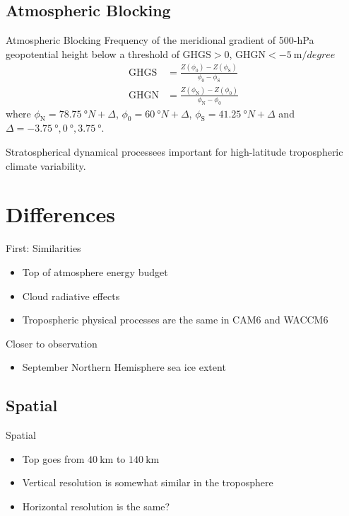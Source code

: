 \documentclass[xcolor=dvipsnames]{beamer} %
\begin{document}
\subsection{Atmospheric Blocking}
\begin{frame}{Atmospheric Blocking}
	\scriptsize
	Frequency of the meridional gradient of 500-hPa geopotential height below a
	threshold of $ \mathrm{GHGS}>0$, $\mathrm{GHGN}<\SI{-5}{\metre/degree} $
	\begin{align*}
		\mathrm{GHGS} & =\frac{Z(\phi_0)-Z(\phi_{\mathrm{S}})}{\phi_0-\phi_{\mathrm{S}}} \\
		\mathrm{GHGN} & =\frac{Z(\phi_{\mathrm{N}})-Z(\phi_0)}{\phi_\mathrm{N}-\phi_0}
		\label{eq:blocking-frequency}
	\end{align*}
	where \(\phi_{\mathrm{N}}=\SI{78.75}{\degree N}+\Delta\),
	\(\phi_{0}=\SI{60}{\degree N}+\Delta\), \(\phi_{\mathrm{S}}=\SI{41.25}{\degree N}+\Delta\)
	and \(\Delta=\SI{-3.75}{\degree},\SI{0}{\degree},\SI{3.75}{\degree}\).\cite{dandrea1998}

    Stratospherical dynamical processees important for high-latitude tropospheric
    climate variability.
\end{frame}

\section{Differences}

\begin{frame}{First: Similarities}
	\begin{itemize}
		\item Top of atmosphere energy budget
		\item Cloud radiative effects
		\item Tropospheric physical processes are the same in CAM6 and WACCM6
	\end{itemize}
\end{frame}

\begin{frame}{Closer to observation}
	\begin{itemize}
		\item September Northern Hemisphere sea ice extent
	\end{itemize}
\end{frame}

\subsection{Spatial}
\begin{frame}{Spatial}
	\begin{itemize}
		\item Top goes from $ \SI{40}{\kilo\metre} $ to $ \SI{140}{\kilo\metre} $
		\item Vertical resolution is somewhat similar in the troposphere
		\item Horizontal resolution is the same?
	\end{itemize}
\end{frame}
\end{document}
